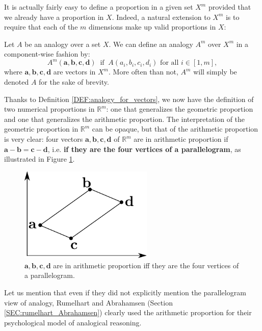 It is actually fairly easy to define a proportion in a given set $X^m$ provided
that we already have a proportion in $X$. Indeed, a natural extension to $X^m$
is to require that each of the $m$ dimensions make up valid proportions in $X$:

\begin{definition}
  \label{DEF:analogy_for_vectors}
  Let $A$ be an analogy over a set $X$. We can define an analogy $A^m$ over
  $X^m$ in a component-wise fashion by:
  $$A^m(\mathbf{a}, \mathbf{b}, \mathbf{c}, \mathbf{d}) ~ \text{  if  } ~
  A(a_i, b_i, c_i, d_i) \text{ for all } i \in [1, m],$$
  where $\mathbf{a}, \mathbf{b}, \mathbf{c}, \mathbf{d}$ are vectors in $X^m$.
  More often than not, $A^m$ will simply be denoted $A$ for the sake of
  brevity.
\end{definition}
\noindent
Thanks to Definition \ref{DEF:analogy_for_vectors}, we now have the definition
of two numerical proportions in $\mathbb{R}^m$: one that generalizes the
geometric proportion and one that generalizes the arithmetic proportion.  The
interpretation of the geometric proportion in $\mathbb{R}^m$ can be opaque, but
that of the arithmetic proportion is very clear: four vectors $\mathbf{a},
\mathbf{b}, \mathbf{c}, \mathbf{d}$ of $\mathbb{R}^m$ are in arithmetic
proportion if $\mathbf{a} - \mathbf{b} = \mathbf{c} - \mathbf{d}$, i.e.
\textbf{if they are the four vertices of a parallelogram}, as illustrated in
Figure \ref{FIG:arithmetic_proportion}.
\begin{figure}[!h]
\centering
  \includegraphics[width=2.5in]{figures/arithmetic_proportion.pdf}
  \caption{$\mathbf{a}, \mathbf{b}, \mathbf{c}, \mathbf{d}$
  are in arithmetic proportion iff they are the four vertices of a
  parallelogram.}
\label{FIG:arithmetic_proportion}
\end{figure}

Let us mention that even if they did not explicitly mention the parallelogram
view of analogy, Rumelhart and Abrahamsen (Section
\ref{SEC:rumelhart_Abrahamsen}) clearly used the arithmetic proportion for
their psychological model of analogical reasoning.

